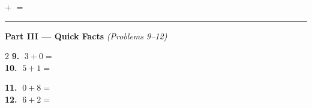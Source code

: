 \documentclass[12pt, letterpaper]{article}
\newcommand{\numbox}{\fbox{\hspace{0.6cm}\vphantom{0}}}
\begin{document}
\medskip
\hspace{2em} \numbox \; $+$ \; \numbox \; $=$ \; \numbox

\bigskip
\noindent\textcolor{scholared}{\rule{\linewidth}{0.4pt}}

\noindent\textcolor{scholared}{\large\textbf{Part III — Quick Facts}} \hfill \textit{(Problems 9–12)}

\bigskip
\begin{multicols}{2}
\noindent\textbf{9.} $\; 3 + 0 = $ \numbox \\[12pt]
\noindent\textbf{10.} $\; 5 + 1 = $ \numbox \\

\columnbreak

\noindent\textbf{11.} $\; 0 + 8 = $ \numbox \\[12pt]
\noindent\textbf{12.} $\; 6 + 2 = $ \numbox \\
\end{multicols}
\end{document}

